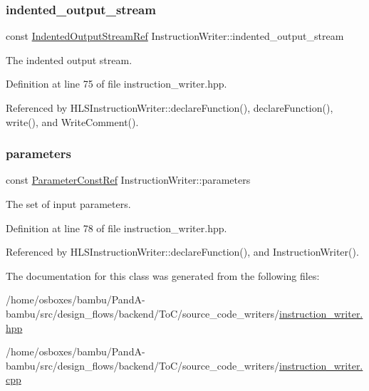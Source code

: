 \subsubsection{\texorpdfstring{indented\+\_\+output\+\_\+stream}{indented\_output\_stream}}
{\footnotesize\ttfamily const \hyperlink{indented__output__stream_8hpp_ab32278e11151ef292759c88e99b77feb}{Indented\+Output\+Stream\+Ref} Instruction\+Writer\+::indented\+\_\+output\+\_\+stream\hspace{0.3cm}{\ttfamily [protected]}}



The indented output stream. 



Definition at line 75 of file instruction\+\_\+writer.\+hpp.



Referenced by H\+L\+S\+Instruction\+Writer\+::declare\+Function(), declare\+Function(), write(), and Write\+Comment().

\mbox{\label{classInstructionWriter_a331d7d35c5526ead7951c74f4ecbe667}} 
\subsubsection{\texorpdfstring{parameters}{parameters}}
{\footnotesize\ttfamily const \hyperlink{Parameter_8hpp_a37841774a6fcb479b597fdf8955eb4ea}{Parameter\+Const\+Ref} Instruction\+Writer\+::parameters\hspace{0.3cm}{\ttfamily [protected]}}



The set of input parameters. 



Definition at line 78 of file instruction\+\_\+writer.\+hpp.



Referenced by H\+L\+S\+Instruction\+Writer\+::declare\+Function(), and Instruction\+Writer().



The documentation for this class was generated from the following files\+:\begin{DoxyCompactItemize}
\item 
/home/osboxes/bambu/\+Pand\+A-\/bambu/src/design\+\_\+flows/backend/\+To\+C/source\+\_\+code\+\_\+writers/\hyperlink{instruction__writer_8hpp}{instruction\+\_\+writer.\+hpp}\item 
/home/osboxes/bambu/\+Pand\+A-\/bambu/src/design\+\_\+flows/backend/\+To\+C/source\+\_\+code\+\_\+writers/\hyperlink{instruction__writer_8cpp}{instruction\+\_\+writer.\+cpp}\end{DoxyCompactItemize}
